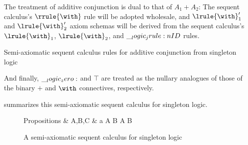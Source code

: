 
The treatment of additive conjunction is dual to that of $A_1 \plus A_2$:
The sequent calculus's $\rrule{\with}$ rule will be adopted wholesale, and $\lrule{\with}'_1$ and $\lrule{\with}'_2$ axiom schemas will be derived from the sequent calculus's $\lrule{\with}_1$, $\lrule{\with}_2$, and $\__logic_jrule:n {ID}$ rules.
%
\begin{marginfigure}
  \caption{Semi-axiomatic sequent calculus rules for additive conjunction from singleton logic}
\end{marginfigure}%
%
And finally, $\__logic_zero:$ and $\top$ are treated as the nullary analogues of those of the binary $\plus$ and $\with$ connectives, respectively.

 summarizes this semi-axiomatic sequent calculus for singleton logic.
%
\begin{figure}[tbp]
  \vspace*{\dimexpr-\abovedisplayskip-\abovecaptionskip\relax}
  \begin{syntax*}
    Propositions &
      A,B,C & a \mid A \plus B \mid \zero \mid A \with B \mid \top
  \end{syntax*}
  \vspace{-\belowdisplayskip}
  \caption{A semi-axiomatic sequent calculus for singleton logic}%
  \label{fig:singleton-logic:hilbert}
\end{figure}
%



